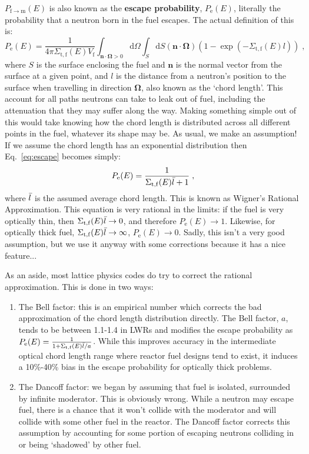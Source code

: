 \documentclass{article}
\begin{document}
$P_{\mathrm{f}\rightarrow\mathrm{m}}(E)$ is also known as the \textbf{escape probability}, $P_\mathrm{e}(E)$, literally the probability that a neutron born in the fuel escapes. The actual definition of this is:
\begin{equation}\label{eq:escape}
    P_\mathrm{e}(E) = \frac{1}{4\pi\Sigma_\mathrm{t,f}(E)V_\mathrm{f}}\int_{\mathbf{n}\cdot\mathbf{\Omega}>0}\mathrm{d}\Omega \int_S \mathrm{d}S (\mathbf{n}\cdot\mathbf{\Omega})\left(1-\exp\left(-\Sigma_\mathrm{t,f}(E)l\right)\right)\;\mathrm{,}
\end{equation}
where $S$ is the surface enclosing the fuel and $\mathbf{n}$ is the normal vector from the surface at a given point, and $l$ is the distance from a neutron's position to the surface when travelling in direction $\mathbf{\Omega}$, also known as the `chord length'. This account for all paths neutrons can take to leak out of fuel, including the attenuation that they may suffer along the way. Making something simple out of this would take knowing how the chord length is distributed across all different points in the fuel, whatever its shape may be. As usual, we make an assumption! If we assume the chord length has an exponential distribution then Eq.~\eqref{eq:escape} becomes simply:
\begin{equation}\label{eq:wigner}
     P_\mathrm{e}(E) = \frac{1}{\Sigma_\mathrm{t,f}(E)\Bar{l} + 1}\;\mathrm{,}
\end{equation}
where $\Bar{l}$ is the assumed average chord length. This is known as Wigner's Rational Approximation. This equation is very rational in the limits: if the fuel is very optically thin, then $\Sigma_\mathrm{t,f}(E)\Bar{l}\rightarrow 0$, and therefore $P_\mathrm{e}(E)\rightarrow 1$. Likewise, for optically thick fuel, $\Sigma_\mathrm{t,f}(E)\Bar{l}\rightarrow \infty$, $P_\mathrm{e}(E)\rightarrow 0$. Sadly, this isn't a very good assumption, but we use it anyway with some corrections because it has a nice feature...

As an aside, most lattice physics codes do try to correct the rational approximation. This is done in two ways:
\begin{enumerate}
    \item The Bell factor: this is an empirical number which corrects the bad approximation of the chord length distribution directly. The Bell factor, $a$, tends to be between 1.1-1.4 in LWRs and modifies the escape probability as $P_\mathrm{e}(E) = \frac{1}{1+\Sigma_\mathrm{t,f}(E)\Bar{l}/a}$. While this improves accuracy in the intermediate optical chord length range where reactor fuel designs tend to exist, it induces a 10\%-40\% bias in the escape probability for optically thick problems.
    \item The Dancoff factor: we began by assuming that fuel is isolated, surrounded by infinite moderator. This is obviously wrong. While a neutron may escape fuel, there is a chance that it won't collide with the moderator and will collide with some other fuel in the reactor. The Dancoff factor corrects this assumption by accounting for some portion of escaping neutrons colliding in or being `shadowed' by other fuel.
\end{enumerate}
\end{document}
